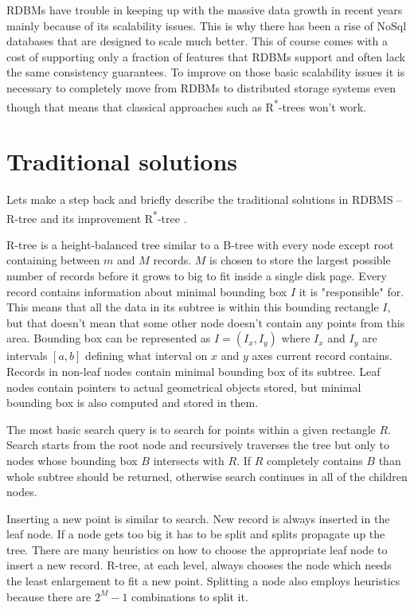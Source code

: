 \documentclass[times, utf8, diplomski]{fer}
\newcommand{\rstar}{R\textsuperscript{*}}
\begin{document}
RDBMs have trouble in keeping up with the massive data growth in recent years mainly because of its scalability issues. This is why there has been a rise of NoSql databases that are designed to scale much better. This of course comes with a cost of supporting only a fraction of features that RDBMs support and often lack the same consistency guarantees. To improve on those basic scalability issues it is necessary to completely move from RDBMs to distributed storage systems even though that means that classical approaches such as \rstar-trees won't work.

\section{Traditional solutions} \label{traditional}
Lets make a step back and briefly describe the traditional solutions in RDBMS -- R-tree \citet{rtree} and its improvement \rstar-tree \citet{rstar}.

R-tree is a height-balanced tree similar to a B-tree with every node except root containing between $m$ and $M$ records. $M$ is chosen to store the largest possible number of records before it grows to big to fit inside a single disk page. Every record contains information about minimal bounding box $I$ it is "responsible" for. This means that all the data in its subtree is within this bounding rectangle $I$, but that doesn't mean that some other node doesn't contain any points from this area. Bounding box can be represented as $I = (I_x, I_y)$ where $I_x$ and $I_y$ are intervals $[a, b]$ defining what interval on $x$ and $y$ axes current record contains. Records in non-leaf nodes contain minimal bounding box of its subtree. Leaf nodes contain pointers to actual geometrical objects stored, but minimal bounding box is also computed and stored in them.

The most basic search query is to search for points within a given rectangle $R$. Search starts from the root node and recursively traverses the tree but only to nodes whose bounding box $B$ intersects with $R$. If $R$ completely contains $B$ than whole subtree should be returned, otherwise search continues in all of the children nodes.

Inserting a new point is similar to search. New record is always inserted in the leaf node. If a node gets too big it has to be split and splits propagate up the tree. There are many heuristics on how to choose the appropriate leaf node to insert a new record. R-tree, at each level, always chooses the node which needs the least enlargement to fit a new point. Splitting a node also employs heuristics because there are $2^M-1$ combinations to split it.
\end{document}
